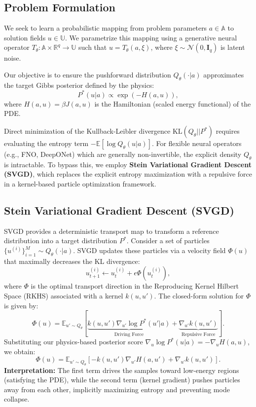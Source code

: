 \documentclass[11pt]{article}
\newcommand{\calN}{\mathcal{N}}
\newcommand{\bbR}{\mathbb{R}}
\newcommand{\bbE}{\mathbb{E}}
\begin{document}
\subsection{Problem Formulation}
We seek to learn a probabilistic mapping from problem parameters $a \in \mathbb{A}$ to solution fields $u \in \mathbb{U}$. We parametrize this mapping using a generative neural operator $T_\theta: \mathbb{A} \times \bbR^q \to \mathbb{U}$ such that $u = T_\theta(a, \xi)$, where $\xi \sim \calN(0, \mathbf{I}_q)$ is latent noise.

Our objective is to ensure the pushforward distribution $Q_\theta(\cdot|a)$ approximates the target Gibbs posterior defined by the physics:
\begin{equation}
    P^*(u|a) \propto \exp(-H(a,u)),
\end{equation}
where $H(a,u) = \beta J(a,u)$ is the Hamiltonian (scaled energy functional) of the PDE.

Direct minimization of the Kullback-Leibler divergence $\text{KL}(Q_\theta || P^*)$ requires evaluating the entropy term $-\bbE[\log Q_\theta(u|a)]$. For flexible neural operators (e.g., FNO, DeepONet) which are generally non-invertible, the explicit density $Q_\theta$ is intractable. To bypass this, we employ \textbf{Stein Variational Gradient Descent (SVGD)}, which replaces the explicit entropy maximization with a repulsive force in a kernel-based particle optimization framework.

\subsection{Stein Variational Gradient Descent (SVGD)}
SVGD provides a deterministic transport map to transform a reference distribution into a target distribution $P^*$. Consider a set of particles $\{u^{(i)}\}_{i=1}^M \sim Q_\theta(\cdot|a)$. SVGD updates these particles via a velocity field $\Phi(u)$ that maximally decreases the KL divergence:
\begin{equation}
    u^{(i)}_{t+1} \leftarrow u^{(i)}_t + \epsilon \Phi(u^{(i)}_t),
\end{equation}
where $\Phi$ is the optimal transport direction in the Reproducing Kernel Hilbert Space (RKHS) associated with a kernel $k(u, u')$. The closed-form solution for $\Phi$ is given by:
\begin{equation}
    \Phi(u) = \bbE_{u' \sim Q_\theta}\left[ \underbrace{k(u, u') \nabla_{u'} \log P^*(u'|a)}_{\text{Driving Force}} + \underbrace{\nabla_{u'} k(u, u')}_{\text{Repulsive Force}} \right].
\end{equation}
Substituting our physics-based posterior score $\nabla_u \log P^*(u|a) = -\nabla_u H(a, u)$, we obtain:
\begin{equation}
    \label{eq:svgd_grad}
    \Phi(u) = \bbE_{u' \sim Q_\theta}\left[ -k(u, u') \nabla_{u'} H(a, u') + \nabla_{u'} k(u, u') \right].
\end{equation}
\textbf{Interpretation:} The first term drives the samples toward low-energy regions (satisfying the PDE), while the second term (kernel gradient) pushes particles away from each other, implicitly maximizing entropy and preventing mode collapse.
\end{document}
